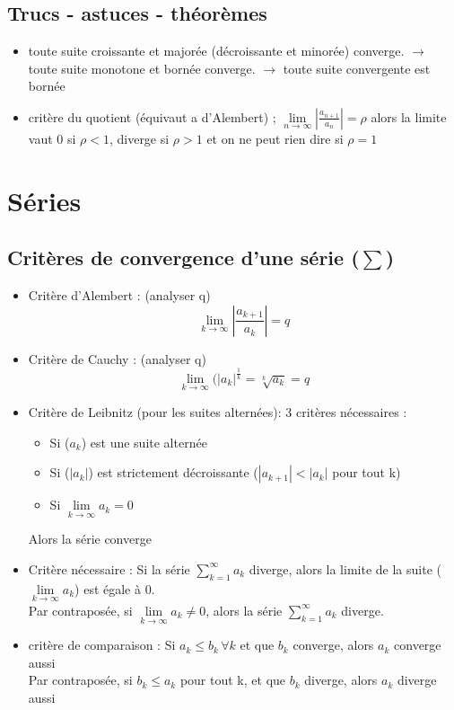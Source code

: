 \documentclass[12pt,a4paper]{article}
\newcommand{\somme}[2]{\ensuremath{\sum\limits_{#2}^{#1}}}
\newcommand{\limite}{\lim\limits_}
\newcommand{\ninf}{\ensuremath{n \to \infty}}
\begin{document}
\subsection{Trucs - astuces - théorèmes}
\begin{itemize}
	\item toute suite croissante et majorée (décroissante et minorée) converge. $\to$ toute suite monotone et bornée converge. $\to$ toute suite convergente est bornée
	\item critère du quotient (équivaut a d'Alembert) ; $\limite{\ninf} \left|\frac{a_{n+1}}{a_n}\right| = \rho$ alors la limite vaut 0 si $\rho < 1$, diverge si $\rho > 1$ et on ne peut rien dire si $\rho = 1$
\end{itemize}
\section{Séries}
\subsection{Critères de convergence d'une série ($\sum$)}
\begin{itemize}
	\item Critère d'Alembert : (analyser q)
		\begin{equation*}
			\limite{k \to \infty}\left|\frac{a_{k+1}}{a_k}\right| = q
		\end{equation*}
	\item Critère de Cauchy : (analyser q)
		\begin{equation*}
			\limite{k\to\infty}(|a_k|^{\frac{1}{k}} = \sqrt[k]{a_k} = q
		\end{equation*}
	\item Critère de Leibnitz (pour les suites alternées): 3 critères nécessaires :
		\begin{itemize}
			\item Si ($a_k$) est une suite alternée 
			\item Si ($|a_k|$) est strictement décroissante  ($|a_{k+1}| < |a_k|$ pour tout k)
			\item Si $\limite{k \to \infty} a_k = 0$
		\end{itemize}
			Alors la série converge
	\item Critère nécessaire : Si la série $\somme{\infty}{k=1}a_k$ diverge, alors la limite de la suite ($\limite{k \to \infty} a_k$) est égale à 0. \\
	Par contraposée, si $\limite{k\to\infty} a_k \neq 0$, alors la série $\somme{\infty}{k=1}a_k$ diverge.
	\item critère de comparaison : Si $a_k \leq b_k \, \forall k$ et que $b_k$ converge, alors $a_k$ converge aussi\\
	Par contraposée, si $b_k \leq a_k$ pour tout k, et que $b_k$ diverge, alors $a_k$ diverge aussi
\end{itemize}
\end{document}
